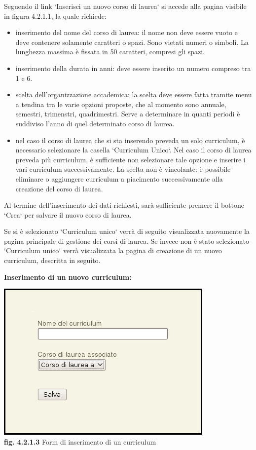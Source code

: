 \documentclass[11pt,a4paper]{article}
\begin{document}
Seguendo il link `Inserisci un nuovo corso di laurea` si accede alla pagina visibile in figura 4.2.1.1, la quale richiede:
\begin{itemize}
 \item inserimento del nome del corso di laurea: il nome non deve essere vuoto e deve contenere solamente caratteri o spazi. Sono vietati numeri o simboli. La lunghezza massima è fissata in 50 caratteri, compresi gli spazi.
 \item inserimento della durata in anni: deve essere inserito un numero compreso tra 1 e 6.
 \item scelta dell'organizzazione accademica: la scelta deve essere fatta tramite menu a tendina tra le varie opzioni proposte, che al momento sono annuale, semestri, trimenstri, quadrimestri. Serve a determinare in quanti periodi è suddiviso l'anno di quel determinato corso di laurea.
 \item nel caso il corso di laurea che si sta inserendo preveda un solo curriculum, è necessario selezionare la casella `Curriculum Unico`. Nel caso il corso di laurea preveda più curriculum, è sufficiente non selezionare tale opzione e inserire i vari curriculum successivamente. La scelta non è vincolante: è possibile eliminare o aggiungere curriculum a piacimento successivamente alla creazione del corso di laurea.
\end{itemize}
Al termine dell'inserimento dei dati richiesti, sarà sufficiente premere il bottone `Crea` per salvare il nuovo corso di laurea.

Se si è selezionato `Curriculum unico` verrà di seguito visualizzata nuovamente la pagina principale di gestione dei corsi di laurea.
Se invece non è stato selezionato `Curriculum unico` verrà visualizzata la pagina di creazione di un nuovo curriculum, descritta in seguito.
\newline \newline
\begin{large}\textbf{Inserimento di un nuovo curriculum:}\end{large}

\bigskip
\begin{center}
	\includegraphics[scale=0.5]{images/nuovo_curriculum.jpg}\\
	\textbf{fig. 4.2.1.3} Form di inserimento di un curriculum\\
\end{center}
\bigskip
\end{document}
